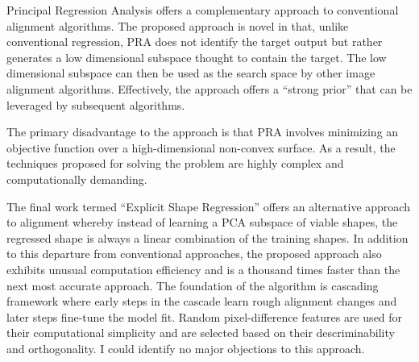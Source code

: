 \documentclass[12pt]{article}
\begin{document}
\par
Principal Regression Analysis offers a complementary approach to conventional alignment algorithms.
The proposed approach is novel in that, unlike conventional regression, PRA does not identify the target output but rather generates a low dimensional subspace thought to contain the target.
The low dimensional subspace can then be used as the search space by other image alignment algorithms.
Effectively, the approach offers a ``strong prior'' that can be leveraged by subsequent algorithms.
\par
The primary disadvantage to the approach is that PRA involves minimizing an objective function over a high-dimensional non-convex surface.
As a result, the techniques proposed for solving the problem are highly complex and computationally demanding.
\par
The final work termed ``Explicit Shape Regression'' offers an alternative approach to alignment whereby instead of learning a PCA subspace of viable shapes, the regressed shape is always a linear combination of the training shapes.
In addition to this departure from conventional approaches, the proposed approach also exhibits unusual computation efficiency and is a thousand times faster than the next most accurate approach.
The foundation of the algorithm is cascading framework where early steps in the cascade learn rough alignment changes and later steps fine-tune the model fit.
Random pixel-difference features are used for their computational simplicity and are selected based on their descriminability and orthogonality.
I could identify no major objections to this approach.
 
\end{document}
